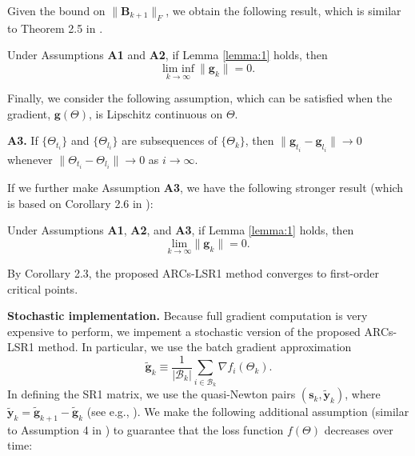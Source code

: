 \medskip

\noindent 
Given the bound on $\| \mathbf{B}_{k+1} \|_F$, we obtain the following result, which is similar to Theorem 2.5 in \citet{cartis2011adaptive}.

\begin{theorem}\label{thm:liminf}
	Under Assumptions \textbf{A1}  and \textbf{A2}, if Lemma \ref{lemma:1} holds, then
	$$\underset{k \to \infty}{\text{lim inf}} \  \|\mathbf{g}_k\| = 0.$$
\end{theorem}

\noindent 
Finally, we consider the following assumption, which can be satisfied when the gradient, $\mathbf{g}(\Theta)$, is Lipschitz continuous on $\Theta$. 

\medskip

\noindent 
\textbf{A3.} If $\{ \Theta_{t_i} \}$ and $\{ \Theta_{l_i} \}$ are subsequences of $\{ \Theta_k \}$, then  $\| \mathbf{g}_{t_i} - \mathbf{g}_{l_i} \| \rightarrow 0$ whenever 
$\| \Theta_{t_i} - \Theta_{l_i} \| \rightarrow 0$ as $i \rightarrow \infty$.


\medskip

\noindent 
If we further make Assumption  \textbf{A3}, we have the following stronger result (which is based on Corollary 2.6 in \citet{cartis2011adaptive}):

\begin{corollary}\label{cor:ARCs}
Under Assumptions \textbf{A1},  \textbf{A2}, and \textbf{A3}, 
 if Lemma \ref{lemma:1} holds, then
	$$\underset{k \to \infty}{\text{lim}} \|\mathbf{g}_k\| = 0.$$
\end{corollary}

By Corollary 2.3, the proposed ARCs-LSR1 method converges to first-order critical points.   


\noindent \textbf{Stochastic implementation.} Because full gradient computation is very expensive to perform, we impement a stochastic version 
of the proposed ARCs-LSR1 method.  In particular, we use the batch gradient approximation
$$
	\tilde{\mathbf{g}}_k \equiv \frac{1}{| \mathcal{B}_k |} \sum_{i \in \mathcal{B}_k} \nabla f_i (\Theta_k).
$$
In defining the SR1 matrix, we use the quasi-Newton pairs $(\mathbf{s}_k, \tilde{\mathbf{y}}_k)$,
where $\tilde{\mathbf{y}}_k = \tilde{\mathbf{g}}_{k+1} - \tilde{\mathbf{g}}_k$ (see e.g., \citet{Erway2020TrustregionAF}).
We make the following additional assumption (similar to Assumption 4 in  \citet{Erway2020TrustregionAF}) to guarantee that the loss function $f(\Theta)$ decreases over time:

